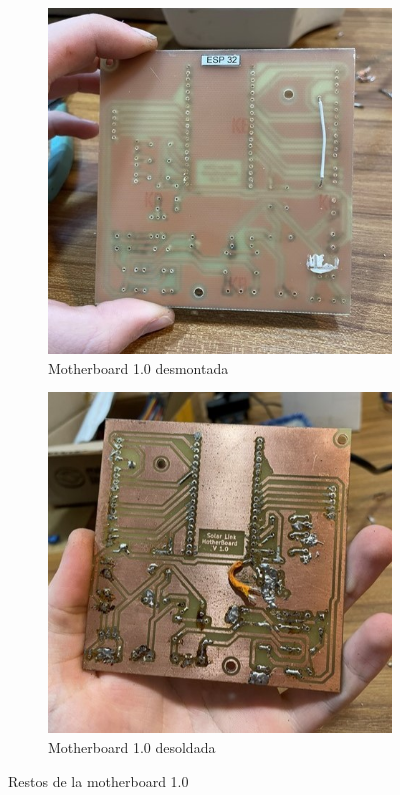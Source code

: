 \begin{figure}[H]

\begin{subfigure}{0.5\textwidth}
\includegraphics[width=0.9\linewidth]{informes/IMG_8934.jpg} 
\caption{Motherboard 1.0 desmontada}
\end{subfigure}
\begin{subfigure}{0.5\textwidth}
\includegraphics[width=0.9\linewidth]{informes/IMG_8935.jpg}
\caption{Motherboard 1.0 desoldada}
\end{subfigure}

\caption{Restos de la motherboard 1.0}
\end{figure}


